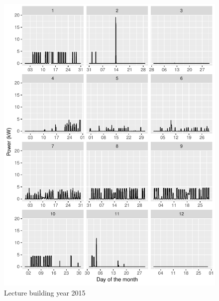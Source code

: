 \documentclass[11pt, oneside]{article}   	%
\begin{document}
\begin{figure}
\includegraphics[keepaspectratio]{lecture_build_Y2015.pdf}
\caption{Lecture building year 2015 }
\end{figure}
\end{document}
